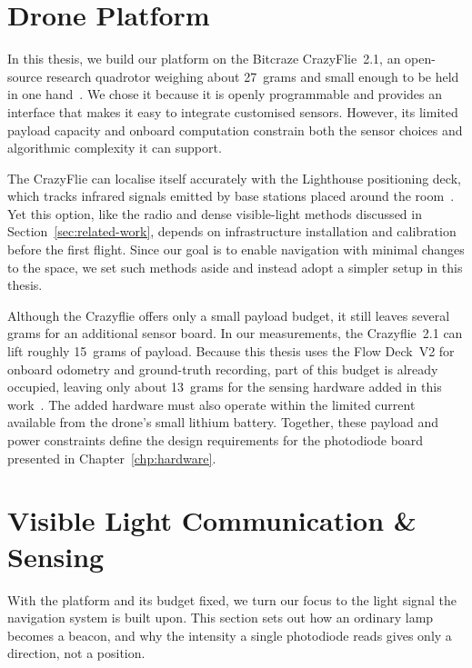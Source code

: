 \section{Drone Platform}
\label{sec:platform}

In this thesis, we build our platform on the Bitcraze CrazyFlie~2.1, an open-source research quadrotor weighing about 27~grams and small enough to be held in one hand~\cite{crazyflie21}. We chose it because it is openly programmable and provides an interface that makes it easy to integrate customised sensors. However, its limited payload capacity and onboard computation constrain both the sensor choices and algorithmic complexity it can support.

The CrazyFlie can localise itself accurately with the Lighthouse positioning deck, which tracks infrared signals emitted by base stations placed around the room~\cite{lighthousedeck}. Yet this option, like the radio and dense visible-light methods discussed in Section~\ref{sec:related-work}, depends on infrastructure installation and calibration before the first flight. Since our goal is to enable navigation with minimal changes to the space, we set such methods aside and instead adopt a simpler setup in this thesis.

Although the Crazyflie offers only a small payload budget, it still leaves several grams for an additional sensor board. In our measurements, the Crazyflie~2.1 can lift roughly 15~grams of payload. Because this thesis uses the Flow Deck~V2 for onboard odometry and ground-truth recording, part of this budget is already occupied, leaving only about 13~grams for the sensing hardware added in this work~\cite{crazyflie21, flowdeckv2}. The added hardware must also operate within the limited current available from the drone's small lithium battery. Together, these payload and power constraints define the design requirements for the photodiode board presented in Chapter~\ref{chp:hardware}.


\section{Visible Light Communication \& Sensing}

With the platform and its budget fixed, we turn our focus to the light signal the navigation system is built upon. This section sets out how an ordinary lamp becomes a beacon, and why the intensity a single photodiode reads gives only a direction, not a position.

